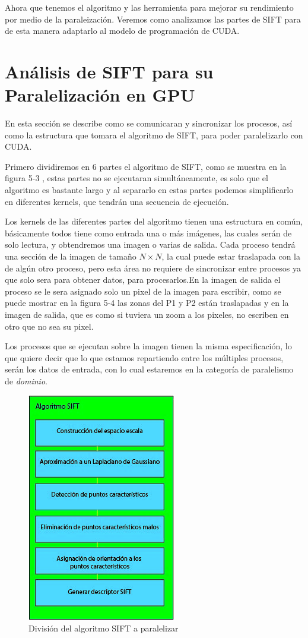 Ahora que tenemos el algoritmo y las herramienta para mejorar su rendimiento por medio de la paraleización. Veremos como analizamos las partes de SIFT para de esta manera adaptarlo al modelo de programación de CUDA.
\pagebreak
\section{Análisis de SIFT para su Paralelización en GPU}

En esta sección se describe como se comunicaran y sincronizar los procesos, así como la estructura que tomara el algoritmo de SIFT, para poder paralelizarlo con CUDA. 

Primero dividiremos en 6 partes el algoritmo de SIFT, como se muestra en la figura 5-3 , estas partes no se ejecutaran simultáneamente, es solo que el algoritmo es bastante largo y al separarlo en estas partes podemos simplificarlo en diferentes kernels, que tendrán una secuencia de ejecución. 


Los kernels de las diferentes partes del algoritmo tienen una estructura en común, básicamente todos tiene como entrada una o más imágenes, las cuales serán de solo lectura, y obtendremos una imagen o varias de salida. Cada proceso tendrá una sección de la imagen de tamaño  $N \times N$, la cual puede estar traslapada con la de algún otro proceso, pero esta área no requiere de sincronizar entre procesos ya que solo sera para obtener datos, para procesarlos.En la imagen de salida el proceso se le sera asignado solo un pixel de la imagen para escribir, como se puede mostrar en la figura 5-4 las zonas del P1 y P2 están traslapadas y en la imagen de salida, que es como si tuviera un zoom a los pixeles, no escriben en otro que no sea su pixel. 

\pagebreak
Los procesos que se ejecutan sobre la imagen tienen la misma especificación, lo que quiere decir que lo que estamos repartiendo entre los múltiples procesos, serán los datos de entrada, con lo cual estaremos en la categoría de paralelismo de \textit{dominio}.

\begin{figure}[ph]
			\centering
				\includegraphics[scale=1]{img/SIFTdiv.jpg}
			\caption{División del algoritmo SIFT a paralelizar}
\end{figure}


